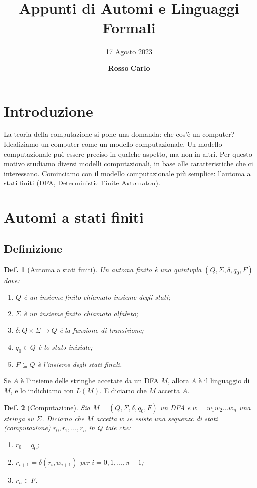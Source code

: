 \documentclass[11pt]{article}
\title{\vspace{2cm}\textbf{Appunti di Automi e Linguaggi Formali}}
\author{\vspace{3mm}17 Agosto 2023}
\date{\vspace{3mm} \textbf{Rosso Carlo}}
\newtheorem{definition}{Def.}[section]
\begin{document}
\begin{titlepage}
	\maketitle
	\thispagestyle{empty}
\end{titlepage}
\tableofcontents
\newpage

\section{Introduzione}
La teoria della computazione si pone una domanda: che cos'è un computer?
Idealiziamo un computer come un modello computazionale. Un modello
computazionale può essere preciso in qualche aspetto, ma non in altri. Per
questo motivo studiamo diversi modelli computazionali, in base alle
caratteristiche che ci interessano. Cominciamo con il modello computazionale più
semplice: l'automa a stati finiti (DFA, Deterministic Finite Automaton).

\section{Automi a stati finiti}

\subsection{Definizione}

\begin{definition}[Automa a stati finiti]
	Un automa finito è una quintupla $(Q, \Sigma, \delta, q_0, F)$ 
	dove:
	\begin{enumerate}
		\item $Q$ è un insieme finito chiamato insieme degli stati;
		\item $\Sigma$ è un insieme finito chiamato alfabeto;
		\item $\delta: Q \times \Sigma \rightarrow Q$ è la funzione di 
			transizione;
		\item $q_0 \in Q$ è lo stato iniziale;
		\item $F \subseteq Q$ è l'insieme degli stati finali.
	\end{enumerate}
\end{definition}

Se $A$ è l'insieme delle stringhe accetate da un DFA $M$, allora $A$ è il
linguaggio di $M$, e lo indichiamo con $L(M)$. E diciamo che $M$ accetta $A$.

\begin{definition}[Computazione]
	Sia $M = (Q, \Sigma, \delta, q_0, F)$ un DFA e $w = w_1w_2 \dots w_n$ una
	stringa su $\Sigma$. Diciamo che $M$ accetta $w$ se esiste una sequenza di
	stati (computazione) $r_0, r_1, \dots, r_n$ in $Q$ tale che:
	\begin{enumerate}
		\item $r_0 = q_0$;
		\item $r_{i+1} = \delta(r_i, w_{i+1})$ per $i = 0, 1, \dots, n-1$;
		\item $r_n \in F$.
	\end{enumerate}
\end{definition}
\end{document}

